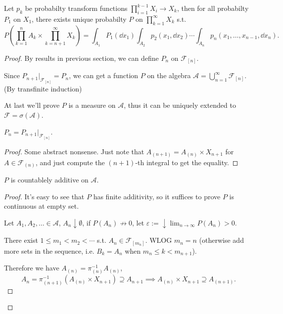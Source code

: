 \begin{theorem}[Tulcea]
    Let $p_k$ be probabilty transform functions $\prod_{i=1}^{k-1}X_i \to X_k$,
	then for all probabilty $P_1$ on $X_1$, there exists unique
	probabilty $P$ on $\prod_{k=1}^\infty X_k$ s.t.
	\[
	P\left(\prod_{k=1}^n A_k \times \prod_{k=n+1}^\infty X_k\right)
	= \int_{A_1}P_1(\dd x_1)\int_{A_2}p_2(x_1, \dd x_2) \cdots
	\int_{A_n} p_n(x_1, \dots, x_{n-1}, \dd x_n).
	\]
\end{theorem}
\begin{proof}[Proof]
    By results in previous section,
	we can define $P_n$ on $\mathscr{F}_{[n]}$.

	Since $P_{n+1}\big|_{\mathscr{F}_{[n]}} = P_n$, we can get
	a function $P$ on the
	algebra $\mathscr{A} = \bigcup_{n=1}^\infty \mathscr{F}_{[n]}$.
	(By transfinite induction)

	At last we'll prove $P$ is a measure on $\mathscr{A}$, thus it can be uniquely
	extended to $\mathscr{F} = \sigma(\mathscr{A})$.

	\begin{claim}
		$P_n = P_{n+1}\big|_{\mathscr{F}_{[n]}}$.
	\end{claim}
	\begin{proof}[Proof]
	    Some abstract nonsense. Just note that $A_{(n+1)} = A_{(n)} \times X_{n+1}$
		for $A \in \mathscr{F}_{(n)}$,
		and just compute the $(n+1)$-th integral to get the equality.
	\end{proof}

	\begin{claim}
	    $P$ is countablely additive on $\mathscr{A}$.
	\end{claim}
	\begin{proof}[Proof]
	    It's easy to see that $P$ has finite additivity,
		so it suffices to prove $P$ is continuous at empty set.

		Let  $A_1, A_2, \dots \in \mathscr{A}$, $A_n \downarrow \emptyset$,
		if  $P(A_n) \not\to 0$,
		let $\varepsilon := \downarrow \lim_{n\to \infty} P(A_n) > 0$.

		There exist $1\le m_1 < m_2 < \cdots$ s.t. $A_n \in \mathscr{F}_{[m_n]}$.
		WLOG $m_n = n$ (otherwise add more sets in the sequence, i.e.
		$B_k = A_n$ when $m_n \le k < m_{n+1}$).

		Therefore we have $A_{(n)} = \pi_{(n)}^{-1} A_{(n)}$,
		\[
		A_n = \pi_{(n+1)}^{-1}(A_{(n)} \times X_{n+1}) \supseteq A_{n+1}
		\implies A_{(n)} \times X_{n+1} \supseteq A_{(n+1)}.
		\]
	\end{proof}
\end{proof}
